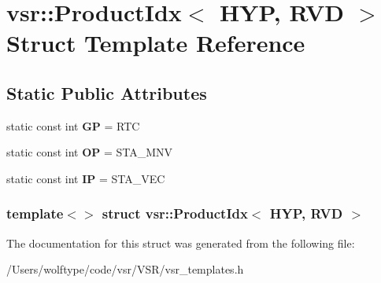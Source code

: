 \hypertarget{structvsr_1_1_product_idx_3_01_h_y_p_00_01_r_v_d_01_4}{\section{vsr\-:\-:Product\-Idx$<$ H\-Y\-P, R\-V\-D $>$ Struct Template Reference}
\label{structvsr_1_1_product_idx_3_01_h_y_p_00_01_r_v_d_01_4}
}
\subsection*{Static Public Attributes}
\begin{DoxyCompactItemize}
\item 
\hypertarget{structvsr_1_1_product_idx_3_01_h_y_p_00_01_r_v_d_01_4_a472d12afff8aa450d2417b10c94befc1}{static const int {\bfseries G\-P} = R\-T\-C}\label{structvsr_1_1_product_idx_3_01_h_y_p_00_01_r_v_d_01_4_a472d12afff8aa450d2417b10c94befc1}

\item 
\hypertarget{structvsr_1_1_product_idx_3_01_h_y_p_00_01_r_v_d_01_4_a70430dc26d34a4165f314c309ede81dc}{static const int {\bfseries O\-P} = S\-T\-A\-\_\-\-M\-N\-V}\label{structvsr_1_1_product_idx_3_01_h_y_p_00_01_r_v_d_01_4_a70430dc26d34a4165f314c309ede81dc}

\item 
\hypertarget{structvsr_1_1_product_idx_3_01_h_y_p_00_01_r_v_d_01_4_aa9b01d357e14826df6b67c92269c55bf}{static const int {\bfseries I\-P} = S\-T\-A\-\_\-\-V\-E\-C}\label{structvsr_1_1_product_idx_3_01_h_y_p_00_01_r_v_d_01_4_aa9b01d357e14826df6b67c92269c55bf}

\end{DoxyCompactItemize}
\subsubsection*{template$<$$>$ struct vsr\-::\-Product\-Idx$<$ H\-Y\-P, R\-V\-D $>$}



The documentation for this struct was generated from the following file\-:\begin{DoxyCompactItemize}
\item 
/\-Users/wolftype/code/vsr/\-V\-S\-R/vsr\-\_\-templates.\-h\end{DoxyCompactItemize}
